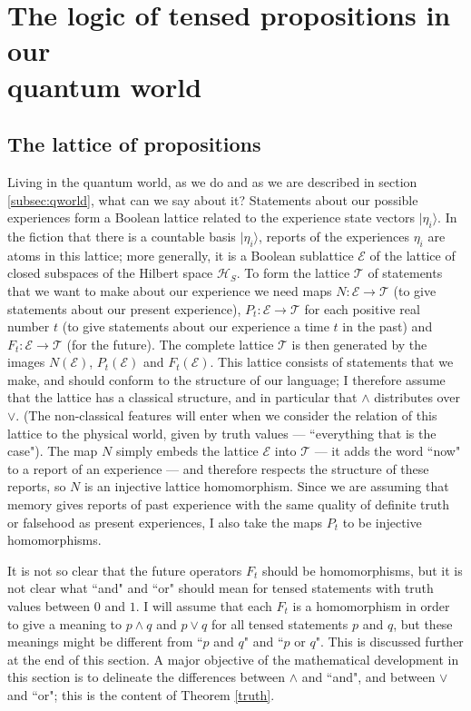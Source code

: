 \documentclass[12pt,reqno]{article}
\renewcommand{\(}{\left(}
\renewcommand{\)}{\right)}
\newcommand{\E}{\mathcal{E}}
\renewcommand{\H}{\mathcal{H}}
\newcommand{\T}{\mathcal{T}}
\newcommand{\<}{\langle}
\renewcommand{\>}{\rangle}
\theoremstyle{plain} %
\begin{document}
\section{The logic of tensed propositions in our \\quantum world}
\label{sec:logic}

\subsection{The lattice of propositions}
\label{subsec:lattice}

Living in the quantum world, as we do and as we are described in section \ref{subsec:qworld}, what can we say about it? Statements about our possible experiences form a Boolean lattice related to the experience state vectors $|\eta_i\>$. In the fiction that there is a countable basis $|\eta_i\>$, reports of the experiences $\eta_i$ are atoms in this lattice; more generally, it is a Boolean sublattice $\E$ of the lattice of closed subspaces of the Hilbert space $\H_S$.  To form the lattice $\T$ of statements that we want to make about our experience we need maps $N:\E\to\T$ (to give statements about our present experience), $P_t:\E\to\T$ for each positive real number $t$ (to give statements about our experience a time $t$ in the past) and $F_t:\E\to\T$ (for the future). The complete lattice $\T$ is then generated by the images $N(\E)$, $P_t(\E)$ and $F_t(\E)$. This lattice consists of statements that we make, and should conform to the structure of our language; I therefore assume that the lattice has a classical structure, and in particular that $\land$ distributes over $\lor$. (The non-classical features will enter when we consider the relation of this lattice to the physical world, given by truth values --- ``everything that is the case"). The map $N$ simply embeds the lattice $\E$ into $\T$ --- it adds the word ``now" to a report of an experience --- and therefore respects the structure of these reports, so $N$ is an injective lattice homomorphism. Since we are assuming that memory gives reports of past experience with the same quality of definite truth or falsehood as present experiences, I also take the maps $P_t$ to be injective homomorphisms. 

It is not so clear that the future operators $F_t$ should be homomorphisms, but it is not clear what ``and" and ``or" should mean for tensed statements with truth values between $0$ and $1$. I will assume that each $F_t$ is a homomorphism in order to give a meaning to $p\land q$ and $p\lor q$ for all tensed statements $p$ and $q$, but these meanings might be different from ``$p$ and $q$" and ``$p$ or $q$". This is discussed further at the end of this section. A major objective of the mathematical development in this section is to delineate the differences between $\land$ and ``and", and between $\lor$ and ``or"; this is the content of Theorem \ref{truth}. 
\end{document}
